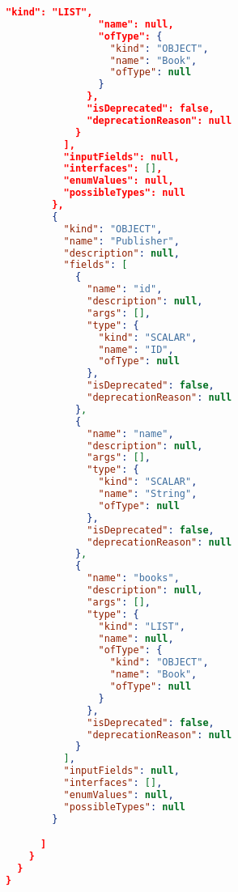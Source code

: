\begin{lstlisting}[language=json]
                "kind": "LIST",
                "name": null,
                "ofType": {
                  "kind": "OBJECT",
                  "name": "Book",
                  "ofType": null
                }
              },
              "isDeprecated": false,
              "deprecationReason": null
            }
          ],
          "inputFields": null,
          "interfaces": [],
          "enumValues": null,
          "possibleTypes": null
        },
        {
          "kind": "OBJECT",
          "name": "Publisher",
          "description": null,
          "fields": [
            {
              "name": "id",
              "description": null,
              "args": [],
              "type": {
                "kind": "SCALAR",
                "name": "ID",
                "ofType": null
              },
              "isDeprecated": false,
              "deprecationReason": null
            },
            {
              "name": "name",
              "description": null,
              "args": [],
              "type": {
                "kind": "SCALAR",
                "name": "String",
                "ofType": null
              },
              "isDeprecated": false,
              "deprecationReason": null
            },
            {
              "name": "books",
              "description": null,
              "args": [],
              "type": {
                "kind": "LIST",
                "name": null,
                "ofType": {
                  "kind": "OBJECT",
                  "name": "Book",
                  "ofType": null
                }
              },
              "isDeprecated": false,
              "deprecationReason": null
            }
          ],
          "inputFields": null,
          "interfaces": [],
          "enumValues": null,
          "possibleTypes": null
        }

      ]
    }
  }
}
\end{lstlisting}


